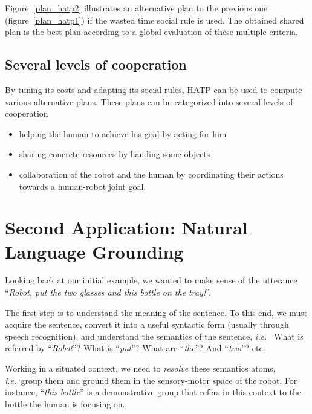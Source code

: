 \documentclass{svmult}
\newcommand{\ie}{{\textit{i.e.~}}}
\begin{document}
Figure~\ref{plan_hatp2} illustrates an alternative plan to the previous 
one (figure~\ref{plan_hatp1}) if the wasted time social rule is used.
The obtained shared plan is the best plan according to a global evaluation of
these multiple criteria.

\subsection*{Several levels of cooperation} 

By tuning its costs and adapting its social rules, HATP can be used to compute
various alternative plans. These plans can be categorized into several levels
of cooperation

\begin{itemize}
\item helping the human to achieve his goal by acting for him
\item sharing concrete resources by handing some objects
\item collaboration of the robot and the human by coordinating their
  actions towards a human-robot joint goal.
\end{itemize}




\section{Second Application: Natural Language Grounding}
\label{dialogs}

Looking back at our initial example, we wanted to make sense of the utterance
``\emph{Robot, put the two glasses and this bottle on the tray!}''.

The first step is to understand the meaning of the sentence. To this end, we
must acquire the sentence, convert it into a useful syntactic form (usually
through speech recognition), and understand the semantics of the sentence, \ie
What is referred by ``\textit{Robot}''? What is ``\textit{put}''? What are
``\textit{the}''? And ``\textit{two}''? etc.

Working in a situated context, we need to \emph{resolve} these semantics atoms,
\ie group them and ground them in the sensory-motor space of the robot. For instance,
``\textit{this bottle}'' is a demonstrative group that refers in this context to the
bottle the human is focusing on.
\end{document}

